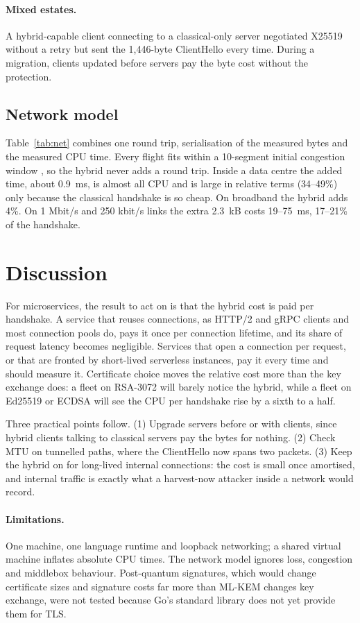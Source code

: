 \documentclass[11pt]{article}
\begin{document}
\paragraph{Mixed estates.} A hybrid-capable client connecting to a classical-only server negotiated X25519 without a retry but sent the
1{,}446-byte ClientHello every time. During a migration, clients updated before servers pay the byte cost without the protection.

\subsection{Network model}

Table~\ref{tab:net} combines one round trip, serialisation of the measured bytes and the measured CPU time. Every flight fits within a
10-segment initial congestion window \cite{rfc6928}, so the hybrid never adds a round trip. Inside a data centre the added time, about
0.9~ms, is almost all CPU and is large in relative terms (34--49\%) only because the classical handshake is so cheap. On broadband the
hybrid adds 4\%. On 1 Mbit/s and 250 kbit/s links the extra 2.3~kB costs 19--75~ms, 17--21\% of the handshake.

\section{Discussion}
For microservices, the result to act on is that the hybrid cost is paid per handshake. A service that reuses connections, as HTTP/2 and
gRPC clients and most connection pools do, pays it once per connection lifetime, and its share of request latency becomes negligible.
Services that open a connection per request, or that are fronted by short-lived serverless instances, pay it every time and should
measure it. Certificate choice moves the relative cost more than the key exchange does: a fleet on RSA-3072 will barely notice the
hybrid, while a fleet on Ed25519 or ECDSA will see the CPU per handshake rise by a sixth to a half.

Three practical points follow. (1) Upgrade servers before or with clients, since hybrid clients talking to classical servers pay the
bytes for nothing. (2) Check MTU on tunnelled paths, where the ClientHello now spans two packets. (3) Keep the hybrid on for long-lived
internal connections: the cost is small once amortised, and internal traffic is exactly what a harvest-now attacker inside a network
would record.

\paragraph{Limitations.} One machine, one language runtime and loopback networking; a shared virtual machine inflates absolute CPU times.
The network model ignores loss, congestion and middlebox behaviour. Post-quantum signatures, which would change certificate sizes and
signature costs far more than ML-KEM changes key exchange, were not tested because Go's standard library does not yet provide them for
TLS.
\end{document}
